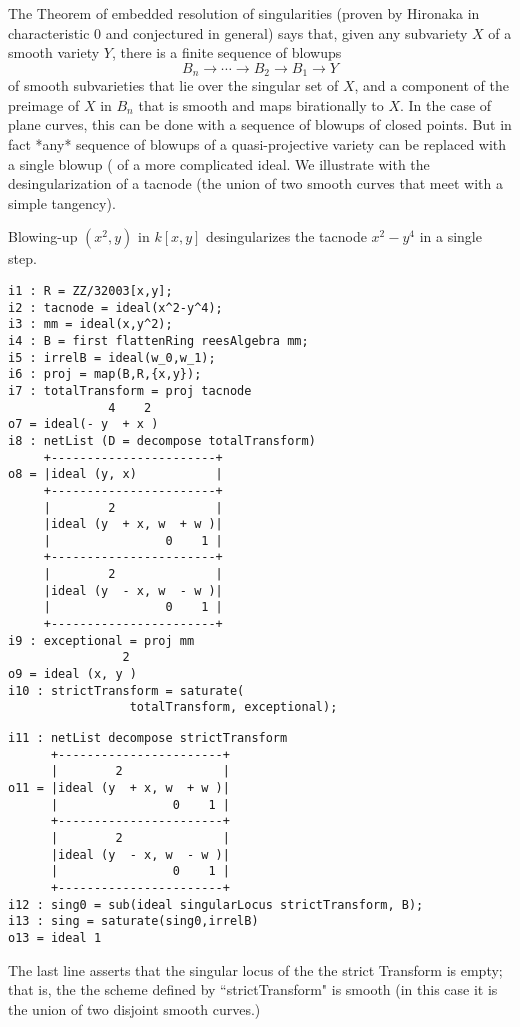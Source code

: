 \documentclass[twoside,12pt, leqno]{amsart}
\begin{document}
The Theorem of embedded resolution of singularities (proven by Hironaka in characteristic 0 and conjectured in general) says that, given any subvariety $X$ of a smooth variety $Y$, there is
a finite sequence of blowups 
$$
B_n \to \cdots \to B_2 \to B_1 \to Y
$$
of smooth subvarieties that lie over the singular set of $X$,  and a component of the preimage of
$X$ in $B_n$ that is smooth and maps birationally to $X$. In the case of plane curves, this can be done with a sequence of blowups of closed points. But in fact *any* sequence of blowups of a quasi-projective variety can be replaced with a single blowup (\cite[Theorem II.7.17]{H} of a more complicated ideal. We illustrate with the desingularization of a tacnode (the union of two smooth curves that meet with a simple tangency).

\begin{example}
Blowing-up $(x^2,y)$ in $k[x,y]$ desingularizes the tacnode $x^2-y^4$ in a single step. 
\end{example}
\begin{footnotesize}
 \begin{verbatim}
i1 : R = ZZ/32003[x,y];
i2 : tacnode = ideal(x^2-y^4);
i3 : mm = ideal(x,y^2);
i4 : B = first flattenRing reesAlgebra mm;
i5 : irrelB = ideal(w_0,w_1);
i6 : proj = map(B,R,{x,y});
i7 : totalTransform = proj tacnode
              4    2
o7 = ideal(- y  + x )
i8 : netList (D = decompose totalTransform)
     +-----------------------+
o8 = |ideal (y, x)           |
     +-----------------------+
     |        2              |
     |ideal (y  + x, w  + w )|
     |                0    1 |
     +-----------------------+
     |        2              |
     |ideal (y  - x, w  - w )|
     |                0    1 |
     +-----------------------+
i9 : exceptional = proj mm
                2
o9 = ideal (x, y )
i10 : strictTransform = saturate(
                 totalTransform, exceptional);
\end{verbatim}
\begin{verbatim}
i11 : netList decompose strictTransform
      +-----------------------+
      |        2              |
o11 = |ideal (y  + x, w  + w )|
      |                0    1 |
      +-----------------------+
      |        2              |
      |ideal (y  - x, w  - w )|
      |                0    1 |
      +-----------------------+
i12 : sing0 = sub(ideal singularLocus strictTransform, B);
i13 : sing = saturate(sing0,irrelB)
o13 = ideal 1
\end{verbatim}
\end{footnotesize}
The last line asserts that the singular locus of the the strict Transform is empty;
that is, the the scheme defined by ``strictTransform" is smooth (in this case it is the union
of two disjoint smooth curves.)
\end{document}

